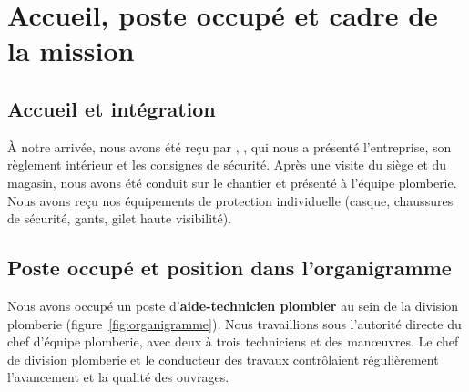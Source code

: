 

\section{Accueil, poste occupé et cadre de la mission}

\subsection{Accueil et intégration}
À notre arrivée, nous avons été reçu par \InfoTuteurPro, \InfoTuteurProPoste, qui nous a
présenté l'entreprise, son règlement intérieur et les consignes de sécurité. Après une visite
du siège et du magasin, nous avons été conduit sur le chantier \InfoChantier{} et présenté à
l'équipe plomberie. Nous avons reçu nos équipements de protection individuelle (casque,
chaussures de sécurité, gants, gilet haute visibilité).

\subsection{Poste occupé et position dans l'organigramme}
Nous avons occupé un poste d'\textbf{aide-technicien plombier} au sein de la division plomberie
(figure~\ref{fig:organigramme}). Nous travaillions sous l'autorité directe du chef d'équipe
plomberie, avec deux à trois techniciens et des manœuvres. Le chef de division plomberie et le
conducteur des travaux contrôlaient régulièrement l'avancement et la qualité des ouvrages.

